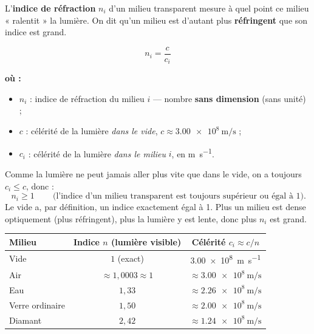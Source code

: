 \documentclass[11pt,a4paper]{article}
\newenvironment{ou}{%
  \par\smallskip\noindent\textbf{où :}\nopagebreak
  \begin{itemize}[leftmargin=1.8em,topsep=2pt,itemsep=1.5pt,parsep=0pt]}%
  {\end{itemize}}
\begin{document}
\begin{definition}
L'\textbf{indice de réfraction} $n_i$ d'un milieu transparent mesure à quel point ce milieu
« ralentit » la lumière. On dit qu'un milieu est d'autant plus \textbf{réfringent} que son indice
est grand.
\end{definition}

\begin{formule}
\[ \boxed{\,n_i = \dfrac{c}{c_i}\,} \]
\begin{ou}
  \item $n_i$ : indice de réfraction du milieu $i$ — nombre \textbf{sans dimension} (sans unité) ;
  \item $c$ : célérité de la lumière \emph{dans le vide}, $c \approx \SI{3.00e8}{\metre\per\second}$ ;
  \item $c_i$ : célérité de la lumière \emph{dans le milieu} $i$, en \si{\metre\per\second}.
\end{ou}
\end{formule}

Comme la lumière ne peut jamais aller plus vite que dans le vide, on a toujours
$c_i \le c$, donc :
\[ \boxed{\,n_i \ge 1\,} \qquad\text{(l'indice d'un milieu transparent est toujours supérieur ou égal à 1).} \]
Le vide a, par définition, un indice exactement égal à 1. Plus un milieu est dense optiquement
(plus réfringent), plus la lumière y est lente, donc plus $n_i$ est grand.

\begin{center}
\begin{tabular}{lcc}
\rowcolor{primary!18}
\textbf{Milieu} & \textbf{Indice $n$ (lumière visible)} & \textbf{Célérité $c_i \approx c/n$} \\
\midrule
Vide        & $1$ (exact)        & \SI{3.00e8}{\metre\per\second} \\
Air         & $\approx 1{,}0003 \approx 1$ & $\approx \SI{3.00e8}{\metre\per\second}$ \\
Eau         & $1{,}33$           & $\approx \SI{2.26e8}{\metre\per\second}$ \\
Verre ordinaire & $1{,}50$       & $\approx \SI{2.00e8}{\metre\per\second}$ \\
Diamant     & $2{,}42$           & $\approx \SI{1.24e8}{\metre\per\second}$ \\
\bottomrule
\end{tabular}
\end{center}
\end{document}
